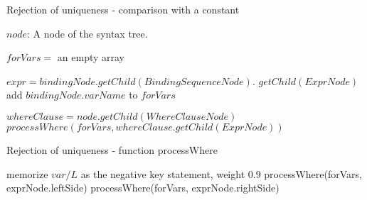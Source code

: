 \begin{algorithm}
\caption{Rejection of uniqueness - comparison with a constant}
\label{ALG_rejection_of_uniqueness_comparison_with_a_constant}
\begin{algorithmic}[1]
\REQUIRE $node$: A node of the syntax tree.

	\STATE $forVars =$ an empty array

            \STATE $expr = bindingNode.getChild(BindingSequenceNode).$ $getChild(ExprNode)$
                \STATE add $bindingNode.varName$ to $forVars$
            \ENDIF
        \ENDIF
    \ENDFOR
    
    \STATE $whereClause = node.getChild(WhereClauseNode)$
    	\STATE $processWhere(forVars, whereClause.getChild(ExprNode))$
	\ENDIF
\ENDIF
\end{algorithmic}
\end{algorithm}

\begin{algorithm}
\caption{Rejection of uniqueness - function processWhere}
\label{ALG_rejection_of_uniqueness_function_process_where}
\begin{algorithmic}[1]

                \STATE memorize $var/L$ as the negative key statement, weight 0.9
            \ENDIF
        \ENDFOR
        \STATE processWhere(forVars, exprNode.leftSide)
        \STATE processWhere(forVars, exprNode.rightSide)
    \ENDIF
\ENDIF

\end{algorithmic}
\end{algorithm}
